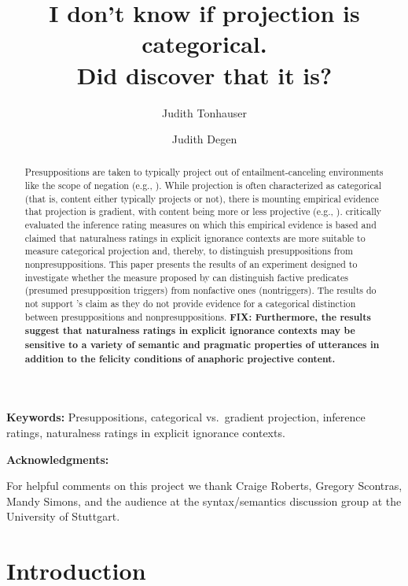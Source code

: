 \documentclass[11pt,fleqn]{article}
\title{I don't know if projection is categorical. \\ Did \citealt{mandelkern-etal2020} discover that it is?}
\author[$\circ$]{Judith Tonhauser}
\author[$\bullet$]{Judith Degen}
\affil[$\circ$]{University of Stuttgart}
\affil[$\bullet$]{Stanford University}
\newcommand{\6}{\mbox{$[\hspace*{-.6mm}[$}}
\newcommand{\9}{\mbox{$]\hspace*{-.6mm}]$}}
\newcommand{\citepos}[1]{\citeauthor{#1}'s \citeyear{#1}}
\begin{document}
\maketitle


\begin{abstract}

Presuppositions are taken to typically project out of entailment-canceling environments like the scope of negation (e.g., \citealt{ccmg90}). While projection is often characterized as categorical (that is, content either typically projects or not), there is mounting empirical evidence that projection is gradient, with content being more or less projective (e.g., \citealt{karttunen71b,xue-onea11,demarneffe-etal-sub23,tbd-variability,degen-tonhauser-language}). \citealt{mandelkern-etal2020} critically evaluated the inference rating measures on which this empirical evidence is based and claimed that naturalness ratings in explicit ignorance contexts are more suitable to measure categorical projection and, thereby, to distinguish presuppositions from nonpresuppositions. This paper presents the results of an experiment designed to investigate whether the measure proposed by \citealt{mandelkern-etal2020} can distinguish factive predicates (presumed presupposition triggers) from nonfactive ones (nontriggers). The results do not support \citepos{mandelkern-etal2020} claim as they do not provide evidence for a categorical distinction between presuppositions and nonpresuppositions. {\bf FIX: Furthermore, the results suggest that naturalness ratings in explicit ignorance contexts may be sensitive to a variety of semantic and pragmatic properties of utterances in addition to the felicity conditions of anaphoric projective content.}

\end{abstract}

\bigskip

\noindent
{\bf Keywords:} Presuppositions, categorical vs.\ gradient projection, inference ratings, naturalness ratings in explicit ignorance contexts. 

\bigskip

\noindent
{\bf Acknowledgments:} 

\noindent
For helpful comments on this project we thank Craige Roberts, Gregory Scontras, Mandy Simons, and the audience at the syntax/semantics discussion group at the University of Stuttgart.

\newpage
		
\section{Introduction}\label{s1}
\end{document}
